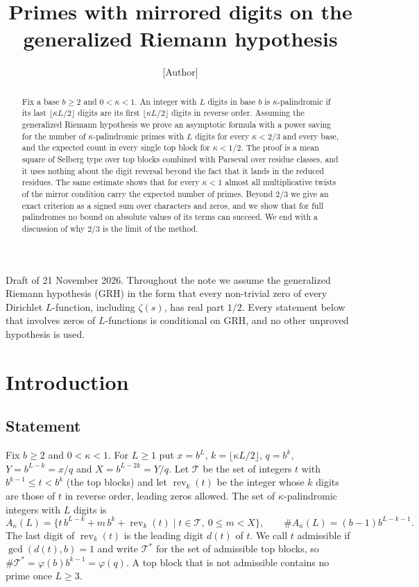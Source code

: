 \documentclass[11pt]{amsart}
\title{Primes with mirrored digits on the generalized Riemann hypothesis}
\author{[Author]}
\date{}
\theoremstyle{definition}
\numberwithin{equation}{section}
\newcommand{\rev}{\operatorname{rev}}
\newcommand{\cT}{\mathcal{T}}
\begin{document}
\begin{abstract}
Fix a base $b\ge2$ and $0<\kappa<1$. An integer with $L$ digits in base $b$ is $\kappa$-palindromic if its last $\lfloor\kappa L/2\rfloor$ digits are its first $\lfloor\kappa L/2\rfloor$ digits in reverse order. Assuming the generalized Riemann hypothesis we prove an asymptotic formula with a power saving for the number of $\kappa$-palindromic primes with $L$ digits for every $\kappa<2/3$ and every base, and the expected count in every single top block for $\kappa<1/2$. The proof is a mean square of Selberg type over top blocks combined with Parseval over residue classes, and it uses nothing about the digit reversal beyond the fact that it lands in the reduced residues. The same estimate shows that for every $\kappa<1$ almost all multiplicative twists of the mirror condition carry the expected number of primes. Beyond $2/3$ we give an exact criterion as a signed sum over characters and zeros, and we show that for full palindromes no bound on absolute values of its terms can succeed. We end with a discussion of why $2/3$ is the limit of the method.
\end{abstract}

\maketitle

\noindent Draft of 21 November 2026. Throughout the note we assume the generalized Riemann hypothesis (GRH) in the form that every non-trivial zero of every Dirichlet $L$-function, including $\zeta(s)$, has real part $1/2$. Every statement below that involves zeros of $L$-functions is conditional on GRH, and no other unproved hypothesis is used.

\section{Introduction}

\subsection{Statement}
Fix $b\ge2$ and $0<\kappa<1$. For $L\ge1$ put $x=b^L$, $k=\lfloor\kappa L/2\rfloor$, $q=b^k$, $Y=b^{L-k}=x/q$ and $X=b^{L-2k}=Y/q$. Let $\cT$ be the set of integers $t$ with $b^{k-1}\le t<b^k$ (the top blocks) and let $\rev_k(t)$ be the integer whose $k$ digits are those of $t$ in reverse order, leading zeros allowed. The set of $\kappa$-palindromic integers with $L$ digits is
\[
A_\kappa(L)=\{t\,b^{L-k}+m\,b^k+\rev_k(t)\mid t\in\cT,\ 0\le m<X\},\qquad \#A_\kappa(L)=(b-1)b^{L-k-1}.
\]
The last digit of $\rev_k(t)$ is the leading digit $d(t)$ of $t$. We call $t$ admissible if $\gcd(d(t),b)=1$ and write $\cT^*$ for the set of admissible top blocks, so $\#\cT^*=\varphi(b)b^{k-1}=\varphi(q)$. A top block that is not admissible contains no prime once $L\ge3$.
\end{document}

